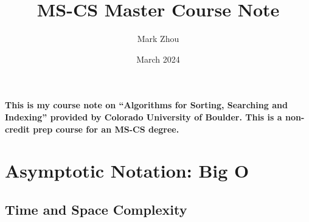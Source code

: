 \documentclass{article}
\title{MS-CS Master Course Note}
\author{Mark Zhou}
\date{March 2024}
\begin{document}
\maketitle
\doublespacing

\paragraph{This is my course note on “Algorithms for Sorting, Searching and Indexing” provided by Colorado University of Boulder. 
This is a non-credit prep course for an MS-CS degree.}

\newpage
\tableofcontents
\newpage

\section{Asymptotic Notation: Big O}

\subsection{Time and Space Complexity}
\end{document}
